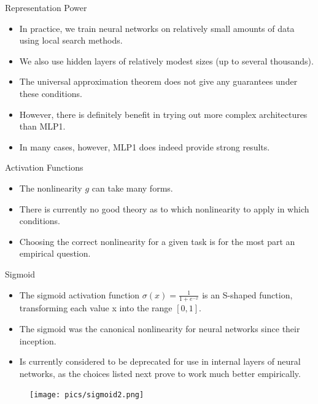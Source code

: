 \documentclass[handout]{beamer}
\begin{document}
\begin{frame}{Representation Power}
\begin{scriptsize}
\begin{itemize}
\item In practice, we train neural networks on relatively small amounts of data using local search methods.
\item We also use hidden layers of relatively modest sizes (up to several thousands). 
\item The universal approximation theorem does not give any guarantees under these conditions.
\item However, there is definitely benefit in trying out more complex architectures than MLP1. 
\item In many cases, however, MLP1 does indeed provide strong results.
\end{itemize}


\end{scriptsize}
\end{frame}








\begin{frame}{Activation Functions}
\begin{scriptsize}
\begin{itemize}
\item The nonlinearity $g$ can take many forms. 
\item There is currently no good theory as to which nonlinearity to apply in which conditions.
\item Choosing the correct nonlinearity for a given task is for the most part an empirical question.
\end{itemize}
\end{scriptsize}
\end{frame}


\begin{frame}{Sigmoid}
\begin{scriptsize}
\begin{itemize}
\item The sigmoid activation function $\sigma(x) = \frac{1}{1+e^{-x}}$ is an S-shaped function, transforming each value x into the range $[0, 1]$.
\item The sigmoid was the canonical nonlinearity for neural networks since their inception.
\item Is currently considered to be deprecated for use in internal layers of neural networks, as the choices listed next prove to work much better empirically.
\end{itemize}

\begin{figure}[htb]
	\centering
	 \texttt{[image: pics/sigmoid2.png]}
\end{figure}

\end{scriptsize}
\end{frame}
\end{document}
